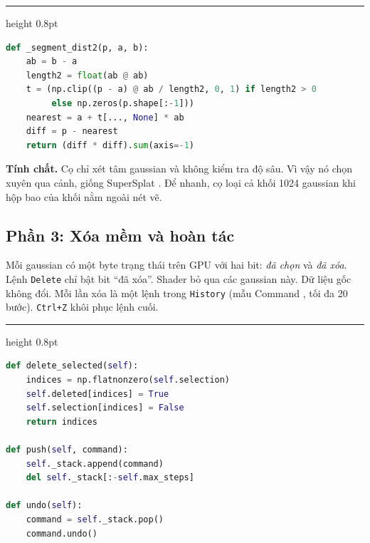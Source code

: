 \documentclass[9pt,twocolumn,a4paper]{extarticle}
\newenvironment{codebox}{\par\vspace{5pt}\noindent\begin{minipage}{\columnwidth}\hrule height 0.8pt\vspace{2pt}}{\end{minipage}\par\vspace{5pt}\noindent\ignorespaces}
\newcommand{\code}[1]{\texttt{#1}}
\begin{document}
\begin{codebox}
\begin{lstlisting}[language=Python,caption={\code{editor/brush.py}, \code{BrushTool.\_segment\_dist2}: kiểm tra capsule},label={lst:capsule}]
def _segment_dist2(p, a, b):
    ab = b - a
    length2 = float(ab @ ab)
    t = (np.clip((p - a) @ ab / length2, 0, 1) if length2 > 0
         else np.zeros(p.shape[:-1]))
    nearest = a + t[..., None] * ab
    diff = p - nearest
    return (diff * diff).sum(axis=-1)
\end{lstlisting}
\end{codebox} 

\textbf{Tính chất.} Cọ chỉ xét tâm gaussian và không kiểm tra độ sâu. Vì vậy nó chọn xuyên qua cảnh, giống SuperSplat \cite{supersplat}. Để nhanh, cọ loại cả khối 1024 gaussian khi hộp bao của khối nằm ngoài nét vẽ.

\subsection{Phần 3: Xóa mềm và hoàn tác}
Mỗi gaussian có một byte trạng thái trên GPU với hai bit: \emph{đã chọn} và \emph{đã xóa}. Lệnh \code{Delete} chỉ bật bit ``đã xóa''. Shader bỏ qua các gaussian này. Dữ liệu gốc không đổi. Mỗi lần xóa là một lệnh trong \code{History} (mẫu Command \cite{gamma1994design}, tối đa 20 bước). \code{Ctrl+Z} khôi phục lệnh cuối.

\begin{codebox}
\begin{lstlisting}[language=Python,caption={\code{core/layer.py} và \code{core/history.py}: xóa mềm và hoàn tác},label={lst:history}]
def delete_selected(self):
    indices = np.flatnonzero(self.selection)
    self.deleted[indices] = True
    self.selection[indices] = False
    return indices

def push(self, command):
    self._stack.append(command)
    del self._stack[:-self.max_steps]

def undo(self):
    command = self._stack.pop()
    command.undo()
\end{lstlisting}
\end{codebox}
\end{document}
